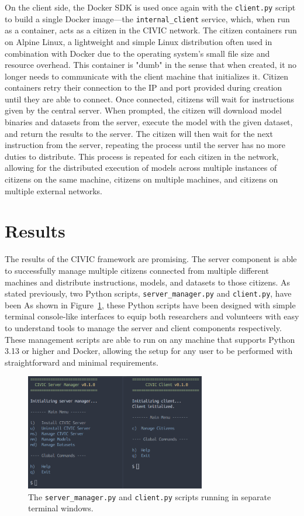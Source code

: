 \documentclass[11pt]{article}
\begin{document}
On the client side, the Docker SDK is used once again with the \verb|client.py| script to build a single Docker image---the \verb|internal_client| service, which, when run as a container, acts as a citizen in the CIVIC network. The citizen containers run on Alpine Linux, a lightweight and simple Linux distribution often used in combination with Docker due to the operating system's small file size and resource overhead. This container is "dumb" in the sense that when created, it no longer needs to communicate with the client machine that initializes it. Citizen containers retry their connection to the IP and port provided during creation until they are able to connect. Once connected, citizens will wait for instructions given by the central server. When prompted, the citizen will download model binaries and datasets from the server, execute the model with the given dataset, and return the results to the server. The citizen will then wait for the next instruction from the server, repeating the process until the server has no more duties to distribute. This process is repeated for each citizen in the network, allowing for the distributed execution of models across multiple instances of citizens on the same machine, citizens on multiple machines, and citizens on multiple external networks. 


\section{Results}

The results of the CIVIC framework are promising. The server component is able to successfully manage multiple citizens connected from multiple different machines and distribute instructions, models, and datasets to those citizens. As stated previously, two Python scripts, \verb|server_manager.py| and \verb|client.py|, have been As shown in Figure~\ref{fig:terminals}, these Python scripts have been designed with simple terminal console-like interfaces to equip both researchers and volunteers with easy to understand tools to manage the server and client components respectively. These management scripts are able to run on any machine that supports Python 3.13 or higher and Docker, allowing the setup for any user to be performed with straightforward and minimal requirements.

\begin{figure}[h]
    \centering
    \includegraphics[width=0.7\textwidth]{./figures/terminals.png}
    \caption{\small The \texttt{server\_manager.py} and \texttt{client.py} scripts running in separate terminal windows.}
    \label{fig:terminals}
\end{figure}
\end{document}
